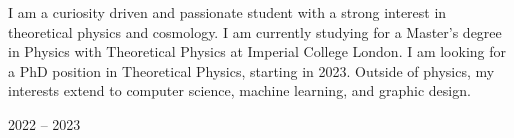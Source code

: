 \documentclass{res}[12pt] %
\begin{document}
\begin{resume}


\sectionRule
\vspace{6pt} %

\large{I am a curiosity driven and passionate student with a strong interest in theoretical physics and cosmology. I am currently studying for a Master's degree in Physics with Theoretical Physics at Imperial College London. I am looking for a PhD position in Theoretical Physics, starting in 2023. Outside of physics, my interests extend to computer science, machine learning, and graphic design.}


\sectionRule
\vspace{6pt} %


 {2022 -- 2023}




\sectionRule
\vspace{6pt} %



\end{resume}
\end{document}
